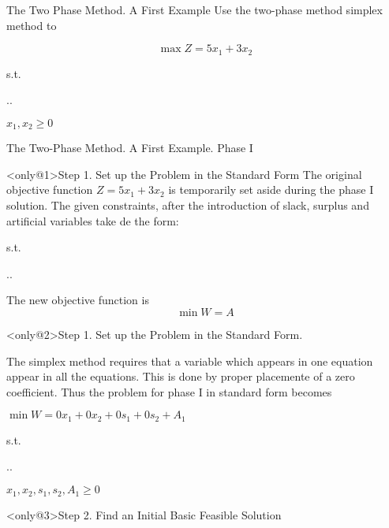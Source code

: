 \begin{frame}{The Two Phase Method. A First Example}
  Use the two-phase method simplex method to

  \[\max Z = 5x_1 + 3x_2\]

  {\centering
    s.t.

  \sysdelim..%

  $x_1, x_2 \geq 0$
\par}
\end{frame}

\begin{frame}{The Two-Phase Method. A First Example. Phase I}

  \begin{block}<only@1>{Step 1. Set up the Problem in the Standard Form} \justifying
    The original objective function $Z = 5x_1 + 3x_2$ is temporarily set aside during the phase I solution. The given constraints, after the introduction of slack, surplus and artificial variables take de the form:


    s.t.

    \sysdelim..%

    \vspace{5mm}
    The new objective function is \[ \min W = A \]
    
  \end{block}
  
  \begin{block}<only@2>{Step 1. Set up the Problem in the Standard Form.} \justifying

    The simplex method requires that a variable which appears in one equation appear in all the equations. This is done by proper placemente of a zero coefficient. Thus the problem for phase I in standard form becomes

   $\min W = 0x_1 + 0x_2 + 0s_1 + 0s_2 + A_1$ 

   s.t.

   \sysdelim..%
    
    $x_1, x_2, s_1, s_2, A_1 \geq 0$
    
  \end{block}

  \begin{block}<only@3>{Step 2. Find an Initial Basic Feasible Solution}


\end{block}
\end{frame}
